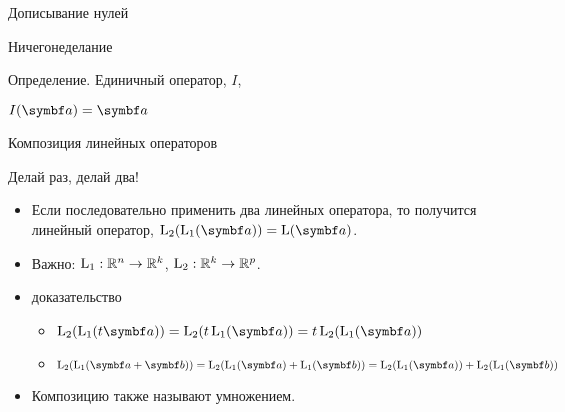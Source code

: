 \begin{frame}{Дописывание нулей}
\begin{minipage}{0.60\linewidth}

\end{minipage}


\end{frame}


\begin{frame}{Ничегонеделание}

    Определение. \alert{Единичный} оператор, $I$,

    $I(\ba) = \ba$


\end{frame}






\begin{frame}{Композиция линейных операторов}

\alert{Делай раз, делай два!}

\begin{itemize}[<+->]
    \item Если последовательно применить два линейных оператора, 
    то получится линейный оператор, $\LL_2 (\LL_1 (\ba)) = \LL(\ba)$.
\item Важно: $\operatorname{L}_1 : \mathbb{R}^n \to \mathbb{R}^k$, $\operatorname{L}_2 : \mathbb{R}^k \to \mathbb{R}^p$.
    \item \alert{доказательство}
\begin{itemize}
  \item $\LL_2 (\LL_1 (t \ba)) = \LL_2 (t \LL_1 (\ba)) = t \LL_2(\LL_1(\ba))$
  \item $\LL_2 (\LL_1 (\ba + \bb)) = \LL_2 (\LL_1 (\ba) + \LL_1(\bb)) = \LL_2(\LL_1(\ba)) + \LL_2(\LL_1(\bb))$
\end{itemize}
\item Композицию также называют умножением.

\end{itemize}

\end{frame}


